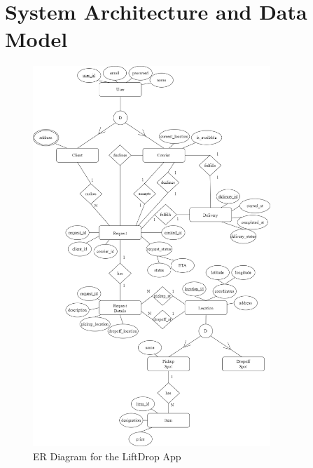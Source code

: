\section{System Architecture and Data Model}
\begin{figure}[h]
    \centering
    \includegraphics[width=0.8\textwidth]{images/LiftDropEA.png}
    \caption{ER Diagram for the LiftDrop App}
    \label{fig:ER_Diagram}
\end{figure}


